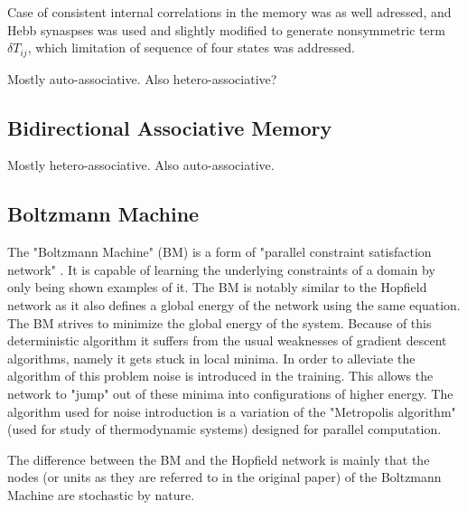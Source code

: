 \documentclass[12pt, a4paper]{article}
\begin{document}
Case of consistent internal correlations in the memory was as well adressed, and Hebb synaspses was used and slightly modified to generate nonsymmetric term~$\delta T_{ij}$, which limitation of sequence of four states was addressed.

Mostly auto-associative. Also hetero-associative?

\subsection{Bidirectional Associative Memory}

Mostly hetero-associative. Also auto-associative.

\subsection{Boltzmann Machine}



The "Boltzmann Machine" (BM) is a form of "parallel constraint satisfaction network" \cite{ackley1985learning}. It is capable of learning the underlying constraints of a domain by only being shown examples of it. The BM is notably similar to the Hopfield network as it also defines a global energy of the network using the same equation. The BM strives to minimize the global energy of the system. Because of this deterministic algorithm it suffers from the usual weaknesses of gradient descent algorithms, namely it gets stuck in local minima. In order to alleviate the algorithm of this problem noise is introduced in the training. This allows the network to "jump" out of these minima into configurations of higher energy. The algorithm used for noise introduction is a variation of the "Metropolis algorithm" \cite{metropolis1953equation} (used for study of thermodynamic systems) designed for parallel computation.

The difference between the BM and the Hopfield network is mainly that the nodes (or units as they are referred to in the original paper) of the Boltzmann Machine are stochastic by nature.


\end{document}
